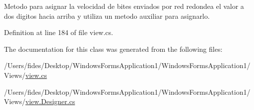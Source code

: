 Metodo para asignar la velocidad de bites enviados por red redondea el valor a dos digitos hacia arriba y utiliza un metodo auxiliar para asignarlo. 



Definition at line 184 of file view.\+cs.



The documentation for this class was generated from the following files\+:\begin{DoxyCompactItemize}
\item 
/\+Users/fides/\+Desktop/\+Windows\+Forms\+Application1/\+Windows\+Forms\+Application1/\+Views/\hyperlink{view_8cs}{view.\+cs}\item 
/\+Users/fides/\+Desktop/\+Windows\+Forms\+Application1/\+Windows\+Forms\+Application1/\+Views/\hyperlink{view_8_designer_8cs}{view.\+Designer.\+cs}\end{DoxyCompactItemize}
